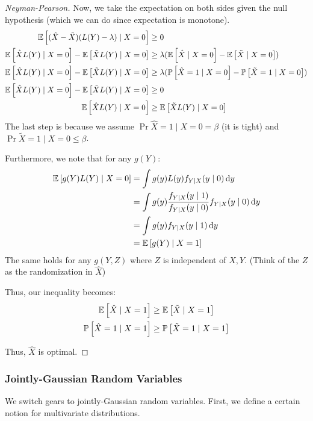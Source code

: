 \begin{proof}[Neyman-Pearson]
    Now, we take the expectation on both sides given the null hypothesis (which we can do since expectation is monotone).
    \begin{align*}
        \mathbb{E}\left[ (\hat{X} - \tilde{X})(L(Y) - \lambda) \mid X = 0 \right] &\geq 0 \\
        \mathbb{E}\left[ \hat{X} L(Y) \mid X = 0 \right] - \mathbb{E}\left[ \tilde{X} L(Y) \mid X = 0 \right] &\geq \lambda(\mathbb{E}\left[ \hat{X} \mid X = 0 \right] - \mathbb{E}\left[ \tilde{X} \mid X = 0 \right]) \\
        \mathbb{E}\left[ \hat{X} L(Y) \mid X = 0 \right] - \mathbb{E}\left[ \tilde{X} L(Y) \mid X = 0 \right] &\geq \lambda(\mathbb{P}\left[ \hat{X} = 1 \mid X = 0 \right] - \mathbb{P}\left[ \tilde{X} = 1 \mid X = 0 \right]) \\
        \mathbb{E}\left[ \hat{X} L(Y) \mid X = 0 \right] - \mathbb{E}\left[ \tilde{X} L(Y) \mid X = 0 \right] &\geq 0 \\
        \mathbb{E}\left[ \hat{X} L(Y) \mid X = 0 \right] &\geq \mathbb{E}\left[ \tilde{X} L(Y) \mid X = 0 \right] \\
    \end{align*}
    The last step is because we assume $\Pr{\hat{X} = 1 \mid X = 0} = \beta$ (it is tight) and $\Pr{\tilde{X} = 1 \mid X = 0} \leq \beta$.

    Furthermore, we note that for any $g(Y)$:
    \begin{align*}
        \mathbb{E}\left[ g(Y) L(Y) \mid X = 0 \right] &= \int g(y) L(y) f_{Y \mid X}(y \mid 0) \dd{y} \\
        &= \int g(y) \frac{f_{Y \mid X}(y \mid 1)}{f_{Y \mid X}(y \mid 0)} f_{Y \mid X}(y \mid 0) \dd{y} \\
        &= \int g(y) f_{Y \mid X}(y \mid 1) \dd{y} \\
        &= \mathbb{E}\left[ g(Y) \mid X = 1 \right] \\
    \end{align*}
    The same holds for any $g(Y, Z)$ where $Z$ is independent of $X, Y$. (Think of the $Z$ as the randomization in $\hat{X}$)

    Thus, our inequality becomes:
    \begin{align*}
        \mathbb{E}\left[ \hat{X} \mid X = 1 \right] &\geq \mathbb{E}\left[ \tilde{X} \mid X = 1 \right] \\
        \mathbb{P}\left[ \hat{X} = 1 \mid X = 1 \right] &\geq \mathbb{P}\left[ \tilde{X} = 1 \mid X = 1 \right] \\
    \end{align*}

    Thus, $\hat{X}$ is optimal.
\end{proof}

\subsubsection{Jointly-Gaussian Random Variables}
We switch gears to jointly-Gaussian random variables. First, we define a certain notion for multivariate distributions.

